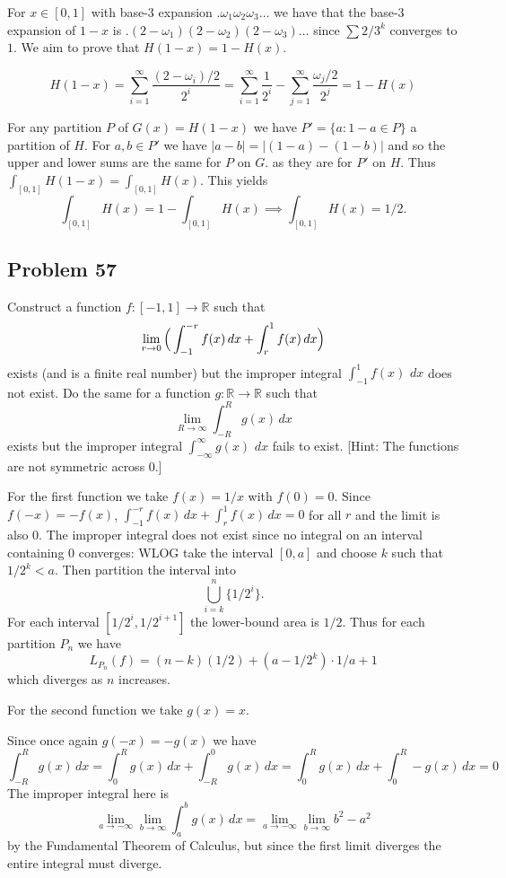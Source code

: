 \documentclass{amsart}
\begin{document}
\medskip \noindent For $x\in [0,1]$ with base-3 expansion $.\omega_1\omega_2\omega_3\dots$ we have that
the base-3 expansion of $1-x$ is $.(2-\omega_1)(2-\omega_2)(2-\omega_3)\dots$ since $\sum 2/3^k$ converges to $1$.
We aim to prove that $H(1-x) = 1-H(x)$.

\[H(1-x)=\sum_{i=1}^{\infty}\frac{(2-\omega_i)/2}{2^i}=\sum_{i=1}^{\infty}\frac{1}{2^i}-\sum_{j=1}^{\infty}\frac{\omega_j/2}{2^j}=1-H(x)\]

For any partition $P$ of $G(x)=H(1-x)$ we have $P' = \{a: 1-a\in P\}$ a partition of $H$. For 
$a, b\in P'$ we have $|a-b| = |(1-a)-(1-b)|$ and so the upper and lower sums are the same for $P$ on $G$. 
as they are for $P'$ on $H$. Thus $\int_{[0,1]}H(1-x)=\int_{[0,1]}H(x)$. This yields \[\int_{[0,1]}H(x)= 1- \int_{[0,1]}H(x)\implies \int_{[0,1]}H(x)=1/2.\]

\newpage

\subsection*{Problem 57} Construct a function $f: [-1, 1]\rightarrow \mathbb{R}$ such that 
\[\lim_{r\rightarrow 0} \Big{(}\int_{-1}^{-r}f(x)\,dx+\int_r^1f(x)\,dx\Big{)}\] exists (and
is a finite real number) but the improper integral $\int_{-1}^1 f(x)$ $dx$ does not exist. 
Do the same for a function $g: \mathbb{R}\rightarrow \mathbb{R}$ such that 
\[\lim_{R\rightarrow\infty}\int_{-R}^{R} g(x)\,dx\] exists but the improper integral 
$\int_{-\infty}^{\infty}g(x)$ $dx$ fails to exist. [Hint: The functions are not symmetric across 0.]

\medskip \noindent For the first function we take $f(x)=1/x$ with $f(0)=0$. Since $f(-x)= -f(x)$, $\int_{-1}^{-r}f(x)\,dx+\int_r^1f(x)\,dx=0$
for all $r$ and the limit is also $0$. The improper integral does not exist since
no integral on an interval containing $0$ converges: WLOG take the interval $[0, a]$ and choose $k$ such that $1/2^k<a$. Then
partition the interval into \[\bigcup_{i=k}^n\{1/2^i\}.\] For each interval $[1/2^i, 1/2^{i+1}]$ the lower-bound area is
$1/2$. Thus for each partition $P_n$ we have  \[L_{P_n}(f) = (n-k)(1/2) + (a-1/2^k)\cdot1/a + 1\] which diverges as $n$ increases.

\medskip \noindent For the second function we take $g(x)=x$.

\medskip \noindent Since once again $g(-x) = -g(x)$ we have \[\int_{-R}^{R} g(x)\,dx=\int_{0}^{R} g(x)\,dx+\int_{-R}^{0} g(x)\,dx=\int_{0}^{R} g(x)\,dx+\int_{0}^{R} -g(x)\,dx=0\]
The improper integral here is \[\lim_{a\rightarrow-\infty}\lim_{b\rightarrow\infty}\int_{a}^{b} g(x)\,dx=\lim_{a\rightarrow-\infty}\lim_{b\rightarrow\infty} b^2-a^2\] 
by the Fundamental Theorem of Calculus, but since the first limit diverges the entire integral must diverge.
\end{document}
